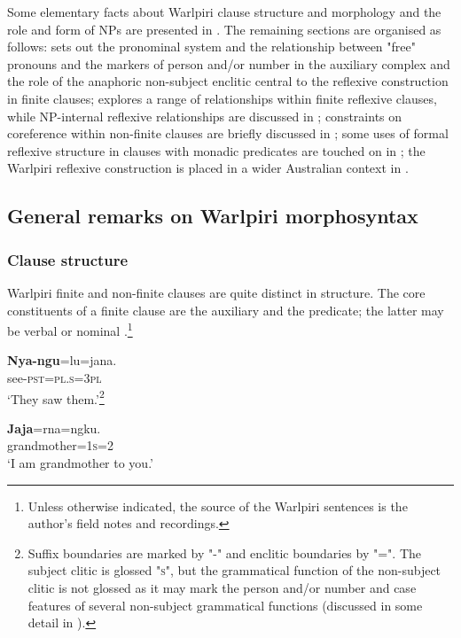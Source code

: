 \documentclass[output=paper]{../langscibook}
\begin{document}
Some elementary facts about Warlpiri clause structure and morphology and the role and form of NPs are presented in . The remaining sections are organised as follows:  sets out the pronominal system and the relationship between "free" pronouns and the markers of person and/or number in the auxiliary complex and the role of the anaphoric non-subject enclitic central to the reflexive construction in finite clauses;  explores a range of relationships within finite reflexive clauses, while NP-internal reflexive relationships are discussed in ; constraints on coreference within non-finite clauses are briefly discussed in ; some uses of formal reflexive structure in clauses with monadic predicates are touched on in ; the Warlpiri reflexive construction is placed in a wider Australian context in .

\subsection{General remarks on Warlpiri morphosyntax}\label{sec:laughren:1.2}

\subsubsection{Clause structure}\label{sec:laughren:1.2.1}

Warlpiri finite and non-finite clauses are quite distinct in structure. The core constituents of a finite clause are the auxiliary and the predicate; the latter may be verbal  or nominal .\footnote{Unless otherwise indicated, the source of the Warlpiri sentences is the author's field notes and recordings.}

\ea%
    \label{ex:laughren:1}
\ea
\label{ex:laughren:1a}
\gll \textbf{Nya-ngu}=lu=jana.\\
    see-\textsc{pst=pl.s=3pl}\\
\glt `They saw them.'\footnote{Suffix boundaries are marked by "-" and enclitic boundaries by "=". The subject clitic is glossed "\textsc{s}", but the grammatical function of the non-subject clitic is not glossed as it may mark the person and/or number and case features of several non-subject grammatical functions (discussed in some detail in ).}

\ex
\label{ex:laughren:1b}
\gll \textbf{Jaja}=rna=ngku.\\
    grandmother=\textsc{1s=2}\\
\glt `I am grandmother to you.'
\z
\z
\end{document}

